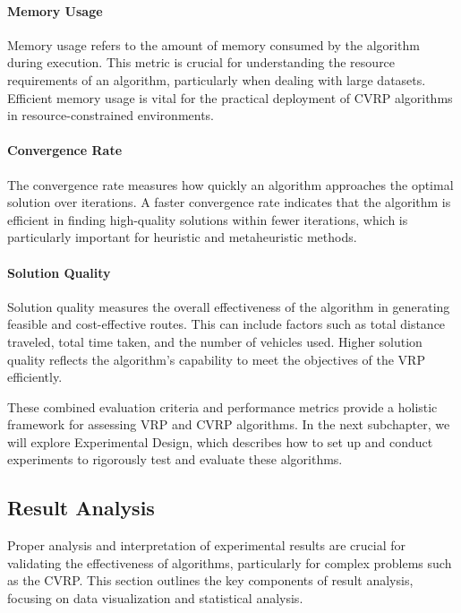 \documentclass{article}
\begin{document}
    \paragraph{Memory Usage} Memory usage refers to the amount of memory consumed by the algorithm during execution. This metric is crucial for understanding the resource requirements of an algorithm, particularly when dealing with large datasets. Efficient memory usage is vital for the practical deployment of CVRP algorithms in resource-constrained environments. \cite{staegemann2024}

    \paragraph{Convergence Rate} The convergence rate measures how quickly an algorithm approaches the optimal solution over iterations. A faster convergence rate indicates that the algorithm is efficient in finding high-quality solutions within fewer iterations, which is particularly important for heuristic and metaheuristic methods. \cite{staegemann2024}

    \paragraph{Solution Quality} Solution quality measures the overall effectiveness of the algorithm in generating feasible and cost-effective routes. This can include factors such as total distance traveled, total time taken, and the number of vehicles used. Higher solution quality reflects the algorithm’s capability to meet the objectives of the VRP efficiently. \cite{staegemann2024}


    These combined evaluation criteria and performance metrics provide a holistic framework for assessing VRP and CVRP algorithms. In the next subchapter, we will explore Experimental Design, which describes how to set up and conduct experiments to rigorously test and evaluate these algorithms.

    \subsection{Result Analysis}\label{subsec:result-analysis}

    Proper analysis and interpretation of experimental results are crucial for validating the effectiveness of algorithms, particularly for complex problems such as the CVRP. This section outlines the key components of result analysis, focusing on data visualization and statistical analysis.
\end{document}
